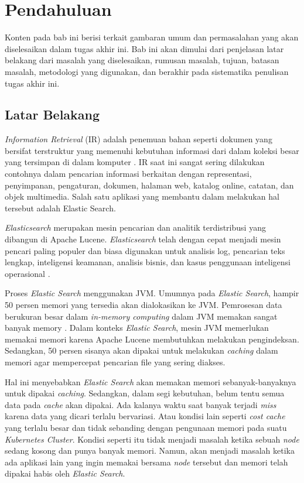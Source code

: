 \chapter{Pendahuluan}

Konten pada bab ini berisi terkait gambaran umum dan permasalahan yang akan diselesaikan dalam tugas akhir ini. Bab ini akan dimulai dari penjelasan latar belakang dari masalah yang diselesaikan, rumusan masalah, tujuan, batasan masalah, metodologi yang digunakan, dan berakhir pada sistematika penulisan tugas akhir ini.

\section{Latar Belakang}

\textit{Information Retrieval} (IR) adalah penemuan bahan seperti dokumen yang bersifat terstruktur yang memenuhi kebutuhan informasi dari dalam koleksi besar yang tersimpan di dalam komputer \parencite{introtoinforetri}. IR saat ini sangat sering dilakukan contohnya dalam pencarian informasi berkaitan dengan representasi, penyimpanan, pengaturan, dokumen, halaman web, katalog online, catatan, dan objek multimedia. Salah satu aplikasi yang membantu dalam melakukan hal tersebut adalah Elastic Search.

\textit{Elasticsearch} merupakan mesin pencarian dan analitik terdistribusi yang dibangun di Apache Lucene. \textit{Elasticsearch} telah dengan cepat menjadi mesin pencari paling populer dan biasa digunakan untuk analisis log, pencarian teks lengkap, inteligensi keamanan, analisis bisnis, dan kasus penggunaan inteligensi operasional \parencite{elasticsearch}.

Proses \textit{Elastic Search} menggunakan JVM. Umumnya pada \textit{Elastic Search}, hampir 50 persen memori yang tersedia akan dialokasikan ke JVM. Pemrosesan data berukuran besar dalam \textit{in-memory computing} dalam JVM memakan sangat banyak memory \parencite{jvm}. Dalam konteks \textit{Elastic Search}, mesin JVM memerlukan memakai memori karena Apache Lucene membutuhkan melakukan pengindeksan. Sedangkan, 50 persen sisanya akan dipakai untuk melakukan \textit{caching} dalam memori agar mempercepat pencarian file yang sering diakses.

Hal ini menyebabkan \textit{Elastic Search} akan memakan memori sebanyak-banyaknya untuk dipakai \textit{caching}. Sedangkan, dalam segi kebutuhan, belum tentu semua data pada \textit{cache} akan dipakai. Ada kalanya waktu saat banyak terjadi \textit{miss} karena data yang dicari terlalu bervariasi. Atau kondisi lain seperti \textit{cost cache} yang terlalu besar dan tidak sebanding dengan pengunaan memori pada suatu \textit{Kubernetes Cluster}. Kondisi seperti itu tidak menjadi masalah ketika sebuah \textit{node} sedang kosong dan punya banyak memori. Namun, akan menjadi masalah ketika ada aplikasi lain yang ingin memakai bersama \textit{node} tersebut dan memori telah dipakai habis oleh \textit{Elastic Search}.

